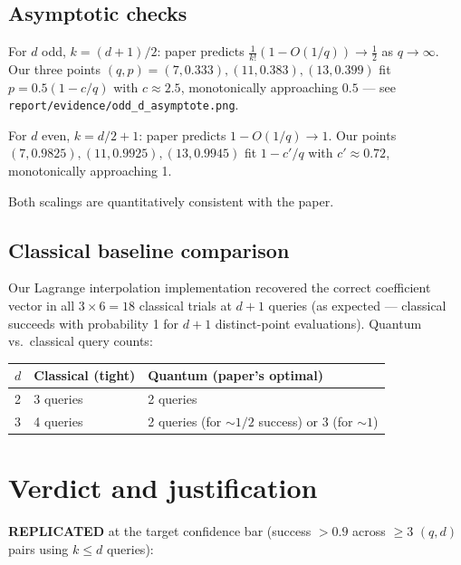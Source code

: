 \documentclass[11pt]{article}
\begin{document}
\subsection{Asymptotic checks}

For $d$ odd, $k = (d+1)/2$: paper predicts $\tfrac{1}{k!}(1 - O(1/q)) \to \tfrac{1}{2}$ as $q \to \infty$.
Our three points $(q, p) = (7, 0.333), (11, 0.383), (13, 0.399)$ fit
$p = 0.5(1 - c/q)$ with $c \approx 2.5$, monotonically approaching $0.5$ — see
\verb|report/evidence/odd_d_asymptote.png|.

For $d$ even, $k = d/2+1$: paper predicts $1 - O(1/q) \to 1$.  Our points $(7, 0.9825),
(11, 0.9925), (13, 0.9945)$ fit $1 - c'/q$ with $c' \approx 0.72$, monotonically approaching 1.

Both scalings are quantitatively consistent with the paper.

\subsection{Classical baseline comparison}

Our Lagrange interpolation implementation recovered the correct coefficient vector in all
$3 \times 6 = 18$ classical trials at $d+1$ queries (as expected --- classical succeeds with
probability 1 for $d+1$ distinct-point evaluations).  Quantum vs.\ classical query counts:

\begin{center}\small
\begin{tabular}{lll}
\toprule
$d$ & Classical (tight) & Quantum (paper's optimal) \\
\midrule
2 & 3 queries & 2 queries \\
3 & 4 queries & 2 queries (for $\sim 1/2$ success) or 3 (for $\sim 1$) \\
\bottomrule
\end{tabular}
\end{center}

\section{Verdict and justification}

\textbf{REPLICATED} at the target confidence bar (success $> 0.9$ across $\ge 3$ $(q, d)$ pairs
using $k \le d$ queries):
\end{document}

